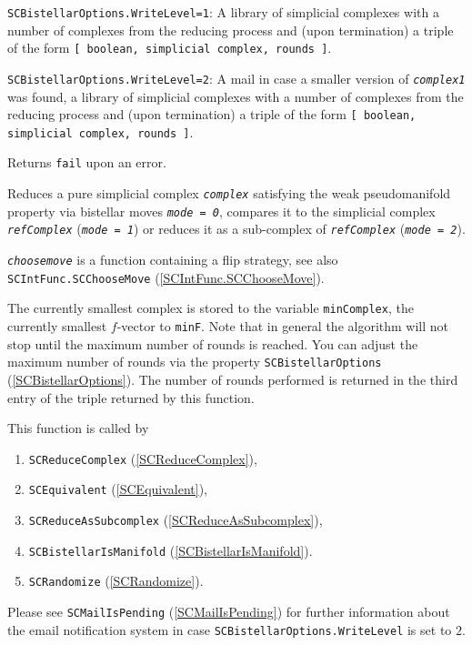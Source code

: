 \documentclass[a4paper,11pt]{report}
\begin{document}
{{{ \texttt{SCBistellarOptions.WriteLevel=1}: A library of simplicial complexes with a number of complexes from the
reducing process and (upon termination) a triple of the form \texttt{[ boolean, simplicial complex, rounds ]}.

 \texttt{SCBistellarOptions.WriteLevel=2}: A mail in case a smaller version of \mbox{\texttt{\mdseries\slshape complex1}} was found, a library of simplicial complexes with a number of complexes from
the reducing process and (upon termination) a triple of the form \texttt{[ boolean, simplicial complex, rounds ]}.

 Returns \texttt{fail} upon an error.



 Reduces a pure simplicial complex \mbox{\texttt{\mdseries\slshape complex}} satisfying the weak pseudomanifold property via bistellar moves \mbox{\texttt{\mdseries\slshape mode = 0}}, compares it to the simplicial complex \mbox{\texttt{\mdseries\slshape refComplex}} (\mbox{\texttt{\mdseries\slshape mode = 1}}) or reduces it as a sub-complex of \mbox{\texttt{\mdseries\slshape refComplex}} (\mbox{\texttt{\mdseries\slshape mode = 2}}).

 \mbox{\texttt{\mdseries\slshape choosemove}} is a function containing a flip strategy, see also \texttt{SCIntFunc.SCChooseMove} (\ref{SCIntFunc.SCChooseMove}). 

 The currently smallest complex is stored to the variable \texttt{minComplex}, the currently smallest $f$-vector to \texttt{minF}. Note that in general the algorithm will not stop until the maximum number of
rounds is reached. You can adjust the maximum number of rounds via the
property \texttt{SCBistellarOptions} (\ref{SCBistellarOptions}). The number of rounds performed is returned in the third entry of the triple
returned by this function.

 This function is called by 
\begin{enumerate}
\item  \texttt{SCReduceComplex} (\ref{SCReduceComplex}),
\item  \texttt{SCEquivalent} (\ref{SCEquivalent}),
\item  \texttt{SCReduceAsSubcomplex} (\ref{SCReduceAsSubcomplex}),
\item  \texttt{SCBistellarIsManifold} (\ref{SCBistellarIsManifold}).
\item  \texttt{SCRandomize} (\ref{SCRandomize}).
\end{enumerate}
 Please see \texttt{SCMailIsPending} (\ref{SCMailIsPending}) for further information about the email notification system in case \texttt{SCBistellarOptions.WriteLevel} is set to $2$.

}}}
\end{document}
